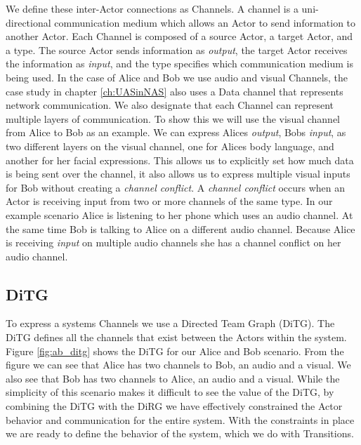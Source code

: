 We define these inter-Actor connections as Channels.  A channel is a uni-directional communication medium which allows an Actor to send information to another Actor.  Each Channel is composed of a source Actor, a target Actor, and a type.  The source Actor sends information as {\em output}, the target Actor receives the information as {\em input}, and the type specifies which communication medium is being used.  In the case of Alice and Bob we use audio and visual Channels\cite{wickens2002multiple}, the case study in chapter \ref{ch:UASinNAS} also uses a Data channel that represents network communication.  We also designate that each Channel can represent multiple layers of communication.  To show this we will use the visual channel from Alice to Bob as an example.  We can express Alices {\em output}, Bobs {\em input}, as two different layers on the visual channel, one for Alices body language, and another for her facial expressions.  This allows us to explicitly set how much data is being sent over the channel, it also allows us to express multiple visual inputs for Bob without creating a {\em channel conflict}.  A {\em channel conflict} occurs when an Actor is receiving input from two or more channels of the same type.  In our example scenario Alice is listening to her phone which uses an audio channel.  At the same time Bob is talking to Alice on a different audio channel.  Because Alice is receiving {\em input} on multiple audio channels she has a channel conflict on her audio channel.  

\subsection{DiTG}
To express a systems Channels we use a Directed Team Graph (DiTG)\cite{FVHMS}.  The DiTG defines all the channels that exist between the Actors within the system.  Figure \ref{fig:ab_ditg} shows the DiTG for our Alice and Bob scenario.  From the figure we can see that Alice has two channels to Bob, an audio and a visual.  We also see that Bob has two channels to Alice, an audio and a visual.  While the simplicity of this scenario makes it difficult to see the value of the DiTG, by combining the DiTG with the DiRG we have effectively constrained the Actor behavior and communication for the entire system.  With the constraints in place we are ready to define the behavior of the system, which we do with Transitions.

